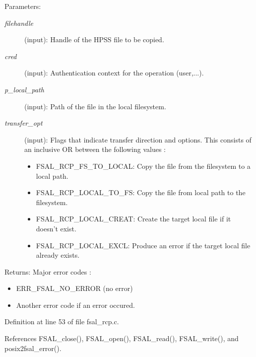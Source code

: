 \begin{Desc}
\item[Parameters:]
\begin{description}
\item[{\em filehandle}](input): Handle of the HPSS file to be copied. \item[{\em cred}](input): Authentication context for the operation (user,...). \item[{\em p\_\-local\_\-path}](input): Path of the file in the local filesystem. \item[{\em transfer\_\-opt}](input): Flags that indicate transfer direction and options. This consists of an inclusive OR between the following values :\begin{itemize}
\item FSAL\_\-RCP\_\-FS\_\-TO\_\-LOCAL: Copy the file from the filesystem to a local path.\item FSAL\_\-RCP\_\-LOCAL\_\-TO\_\-FS: Copy the file from local path to the filesystem.\item FSAL\_\-RCP\_\-LOCAL\_\-CREAT: Create the target local file if it doesn't exist.\item FSAL\_\-RCP\_\-LOCAL\_\-EXCL: Produce an error if the target local file already exists.\end{itemize}
\end{description}
\end{Desc}
\begin{Desc}
\item[Returns:]Major error codes :\begin{itemize}
\item ERR\_\-FSAL\_\-NO\_\-ERROR (no error)\item Another error code if an error occured. \end{itemize}
\end{Desc}


Definition at line 53 of file fsal\_\-rcp.c.

References FSAL\_\-close(), FSAL\_\-open(), FSAL\_\-read(), FSAL\_\-write(), and posix2fsal\_\-error().